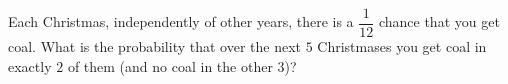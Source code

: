 Each Christmas, independently of other years, there is a $\dfrac{1}{12}$ chance that you get coal. What is the probability that over the next $5$ Christmases you get coal in exactly $2$ of them (and no coal in the other $3$)?
